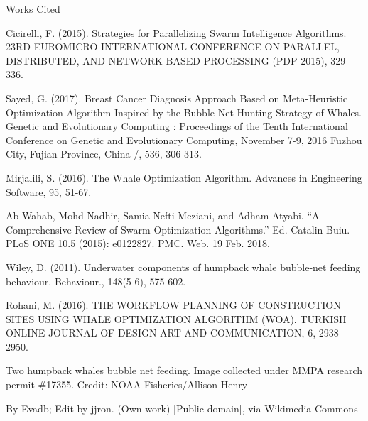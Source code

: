 \documentclass[11pt]{article}
\newcommand{\bibent}{\noindent \hangindent 40pt}
\newenvironment{workscited}{\newpage \begin{center} Works Cited \end{center}}{\newpage }
\begin{document}
\begin{workscited}

\bibent
Cicirelli, F. (2015). Strategies for Parallelizing Swarm Intelligence Algorithms. 23RD EUROMICRO INTERNATIONAL CONFERENCE ON PARALLEL, DISTRIBUTED, AND NETWORK-BASED PROCESSING (PDP 2015), 329-336.

\bibent
Sayed, G. (2017). Breast Cancer Diagnosis Approach Based on Meta-Heuristic Optimization Algorithm Inspired by the Bubble-Net Hunting Strategy of Whales. Genetic and Evolutionary Computing : Proceedings of the Tenth International Conference on Genetic and Evolutionary Computing, November 7-9, 2016 Fuzhou City, Fujian Province, China /, 536, 306-313.

\bibent
Mirjalili, S. (2016). The Whale Optimization Algorithm. Advances in Engineering Software, 95, 51-67.

\bibent
Ab Wahab, Mohd Nadhir, Samia Nefti-Meziani, and Adham Atyabi. “A Comprehensive Review of Swarm Optimization Algorithms.” Ed. Catalin Buiu. PLoS ONE 10.5 (2015): e0122827. PMC. Web. 19 Feb. 2018.

\bibent
Wiley, D. (2011). Underwater components of humpback whale bubble-net feeding behaviour. Behaviour., 148(5-6), 575-602.

\bibent
Rohani, M. (2016). THE WORKFLOW PLANNING OF CONSTRUCTION SITES USING WHALE OPTIMIZATION ALGORITHM (WOA). TURKISH ONLINE JOURNAL OF DESIGN ART AND COMMUNICATION, 6, 2938-2950.

\bibent %
Two humpback whales bubble net feeding. Image collected under MMPA research permit \#17355.
Credit: NOAA Fisheries/Allison Henry

\bibent %
By Evadb; Edit by jjron. (Own work) [Public domain], via Wikimedia Commons

\end{workscited}
\end{document}
